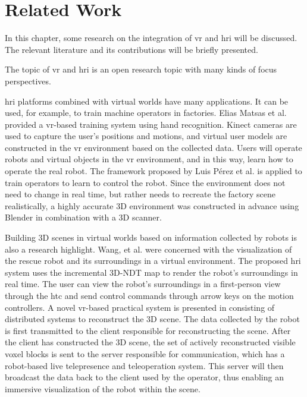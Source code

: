 \chapter{Related Work}
\label{related}

In this chapter, some research on the integration of \gls{vr} and \gls{hri} will be discussed. The relevant literature and its contributions will be briefly presented. 

The topic of \gls{vr} and \gls{hri} is an open research topic with many kinds of focus perspectives.

\gls{hri} platforms combined with virtual worlds have many applications. It can be used, for example, to train machine operators in factories. Elias Matsas et al. \cite{Matsas:2017aa} provided a \gls{vr}-based training system using hand recognition. Kinect cameras are used to capture the user's positions and motions, and virtual user models are constructed in the \gls{vr} environment based on the collected data. Users will operate robots and virtual objects in the \gls{vr} environment, and in this way, learn how to operate the real robot. The framework proposed by Luis Pérez et al. \cite{Perez:2019ub} is applied to train operators to learn to control the robot. Since the environment does not need to change in real time, but rather needs to recreate the factory scene realistically, a highly accurate 3D environment was constructed in advance using Blender in combination with a 3D scanner.

Building 3D scenes in virtual worlds based on information collected by robots is also a research highlight. Wang, et al. \cite{Wang:2017uy} were concerned with the visualization of the rescue robot and its surroundings in a virtual environment. The proposed \gls{hri} system uses the incremental 3D-NDT map to render the robot's surroundings in real time. The user can view the robot's surroundings in a first-person view through the \gls{htc} and send control commands through arrow keys on the motion controllers. A novel \gls{vr}-based practical system is presented in \cite{Stotko:2019ud} consisting of distributed systems to reconstruct the 3D scene. The data collected by the robot is first transmitted to the client responsible for reconstructing the scene. After the client has constructed the 3D scene, the set of actively reconstructed visible voxel blocks is sent to the server responsible for communication, which has a robot-based live telepresence and teleoperation system. This server will then broadcast the data back to the client used by the operator, thus enabling an immersive visualization of the robot within the scene.

